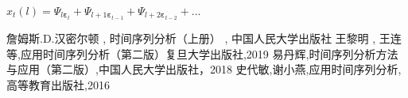 \documentclass[12pt, a4paper, oneside]{ctexbook}
\begin{document}
\noindent $\hat{x}_t(l)=\Psi_{l\boldsymbol{\varepsilon}_t}+\Psi_{l+1\boldsymbol{\varepsilon}_{t-1}}+\Psi_{l+2\boldsymbol{\varepsilon}_{t-2}}+...$





\begin{thebibliography}{4}
    詹姆斯.D.汉密尔顿 {,} 时间序列分析（上册） {,} 中国人民大学出版社
    王黎明 {,} 王连等{,}应用时间序列分析（第二版）复旦大学出版社{,}2019
    易丹辉{,}时间序列分析方法与应用（第二版）{,}中国人民大学出版社，2018
    史代敏{,}谢小燕{,}应用时间序列分析{,}高等教育出版社{,}2016
\end{thebibliography}

\appendix
\end{document}
